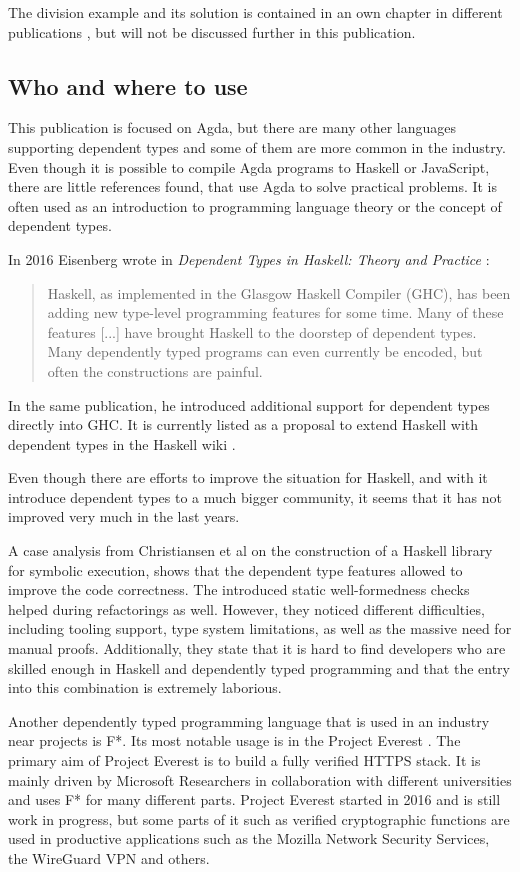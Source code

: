 The division example and its solution is contained in an own chapter in different publications \cite{10.1145/2841316, Bove2009}, but will not be discussed further in this publication.

\subsection{Who and where to use}
This publication is focused on Agda, but there are many other languages supporting dependent types and some of them are more common in the industry.
Even though it is possible to compile Agda programs to Haskell or JavaScript, there are little references found, that use Agda to solve practical problems.
It is often used as an introduction to programming language theory or the concept of dependent types.

In 2016 Eisenberg wrote in \emph{Dependent Types in Haskell: Theory and Practice} \cite{DBLP:journals/corr/Eisenberg16}: 
\begin{quote}
Haskell, as implemented in the Glasgow Haskell Compiler (GHC), has been adding new type-level programming features for some time. Many of these features [...] have brought Haskell to the doorstep of dependent types. Many dependently typed programs can even currently be encoded, but often the constructions are painful.
\end{quote}

In the same publication, he introduced additional support for dependent types directly into GHC. It is currently listed as a proposal to extend Haskell with dependent types in the Haskell wiki \cite{haskell_wiki}.

Even though there are efforts to improve the situation for Haskell, and with it introduce dependent types to a much bigger community, it seems that it has not improved very much in the last years.

A case analysis from Christiansen et al \cite{10.1145/3341704} on the construction of a Haskell library for symbolic execution, shows that the dependent type features allowed to improve the code correctness. 
The introduced static well-formedness checks helped during refactorings as well. 
However, they noticed different difficulties, including tooling support, type system limitations, as well as the massive need for manual proofs. 
Additionally, they state that it is hard to find developers who are skilled enough in Haskell and dependently typed programming and that the entry into this combination is extremely laborious.

Another dependently typed programming language that is used in an industry near projects is F*. 
Its most notable usage is in the Project Everest \cite{project_everest_github_io}. The primary aim of Project Everest is to build a fully verified HTTPS stack.
It is mainly driven by Microsoft Researchers in collaboration with different universities and uses F* for many different parts.
Project Everest started in 2016 and is still work in progress, but some parts of it such as verified cryptographic functions are used in productive applications such as the Mozilla Network Security Services\cite{project_everest_slides}, the WireGuard VPN and others.
